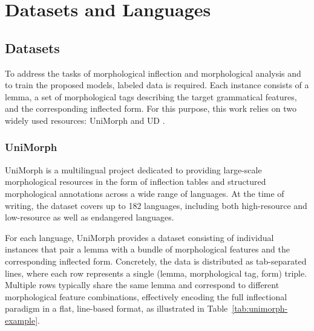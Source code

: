 \chapter{Datasets and Languages}\label{chapter:datasets}

\section{Datasets}

To address the tasks of morphological inflection and morphological analysis and to train the proposed models, labeled data is required. Each instance consists of a lemma, a set of morphological tags describing the target grammatical features, and the corresponding inflected form. For this purpose, this work relies on two widely used resources: UniMorph \parencite{batsuren-etal-2022-unimorph} and \acl{UD} \parencite{nivre-etal-2020-universal}.

\subsection{UniMorph}

UniMorph is a multilingual project dedicated to providing large-scale morphological resources in the form of inflection tables and structured morphological annotations across a wide range of languages. At the time of writing, the dataset covers up to 182 languages, including both high-resource and low-resource as well as endangered languages.

For each language, UniMorph provides a dataset consisting of individual instances that pair a lemma with a bundle of morphological features and the corresponding inflected form. Concretely, the data is distributed as tab-separated lines, where each row represents a single (lemma, morphological tag, form) triple. Multiple rows typically share the same lemma and correspond to different morphological feature combinations, effectively encoding the full inflectional paradigm in a flat, line-based format, as illustrated in Table~\ref{tab:unimorph-example}.

